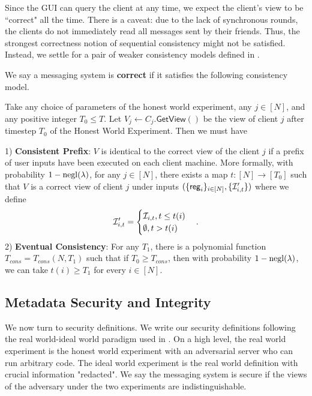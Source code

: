 Since the GUI can query the client at any time, we expect the client's view to be ``correct" all the time. There is a caveat: due to the lack of synchronous rounds, the clients do not immediately read all messages sent by their friends. Thus, the strongest correctness notion of sequential consistency might not be satisfied. Instead, we settle for a pair of weaker consistency models defined in \cite{doug13Consistency}. 
\begin{definition}
\label{defn:messaging-correctness}
 We say a messaging system is \textbf{correct} if it satisfies the following consistency model.
 
 Take any choice of parameters of the honest world experiment, any $j \in [N]$, and any positive integer $T_0 \leq T$. Let $V_j \leftarrow C_j.\mathsf{GetView}()$ be the view of client $j$ after timestep $T_0$ of the Honest World Experiment. Then we must have

1) \textbf{Consistent Prefix}: $V$ is identical to the correct view of the client $j$ if a prefix of user inputs have been executed on each client machine. More formally, with probability $1 - \operatorname{negl}(\lambda)$, for any $j \in [N]$, there exists a map $t: [N] \to [T_0]$ such that  $V$ is a correct view of client $j$ under inputs $(\{\mathsf{reg}_i\}_{i \in [N]}, \{\mathcal{I}'_{i, t}\})$
where we define
$$\mathcal{I}'_{i, t} = \begin{cases}
\mathcal{I}_{i, t}, t \leq t(i) \\
\emptyset, t > t(i)
\end{cases}.$$
2) \textbf{Eventual Consistency}: For any $T_1$, there is a polynomial function $T_{cons} = T_{cons}(N, T_1)$ such that if $T_0 \geq T_{cons}$, then with probability $1 - \operatorname{negl}(\lambda)$, we can take $t(i) \geq T_1$ for every $i \in [N]$.
\end{definition}

\subsection{Metadata Security and Integrity}
\label{subsec:messaging-security-integrity}
We now turn to security definitions. We write our security definitions following the real world-ideal world paradigm used in \cite[Section 2.2]{shi2021non}. On a high level, the real world experiment is the honest world experiment with an adversarial server who can run arbitrary code. The ideal world experiment is the real world definition with crucial information "redacted". We say the messaging system is secure if the views of the adversary under the two experiments are indistinguishable.

